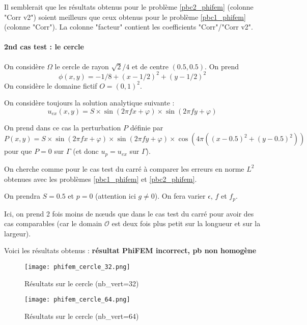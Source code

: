 Il semblerait que les résultats obtenus pour le problème \ref{pbc2_phifem} (colonne "Corr v2") soient meilleurs que ceux obtenus pour le problème \ref{pbc1_phifem} (colonne "Corr"). La colonne "facteur" contient les coefficients "Corr"/"Corr v2".

\paragraph*{2nd cas test : le cercle \\}

On considère $\Omega$ le cercle de rayon $\sqrt{2}/4$ et de centre $(0.5,0.5)$. On prend 
$$\phi(x,y)=-1/8+(x-1/2)^2+(y-1/2)^2$$
On considère le domaine fictif $O=(0,1)^2$.

On considère toujours la solution analytique suivante :
$$u_{ex}(x,y) = S\times\sin(2\pi fx + \varphi)\times\sin(2\pi fy + \varphi)$$ 

On prend dans ce cas la perturbation $P$ définie par
$$P(x,y) = S\times\sin(2\pi fx + \varphi)\times\sin(2\pi fy + \varphi)\times\cos(4\pi((x-0.5)^2+(y-0.5)^2))$$ 
pour que $P=0$ sur $\Gamma$ (et donc $u_p=u_{ex}$ sur $\Gamma$). 

On cherche comme pour le cas test du carré à comparer les erreurs en norme $L^2$ obtenues avec les problèmes \ref{pbc1_phifem} et \ref{pbc2_phifem}.

On prendra $S=0.5$ et $p=0$ (attention ici $g\ne 0$). On fera varier $\epsilon$, $f$ et $f_p$. 

\begin{Rem}
	Ici, on prend 2 fois moins de nœuds que dans le cas test du carré pour avoir des cas comparables (car le domain $\mathcal{O}$ est deux fois plus petit sur la longueur et sur la largeur).
\end{Rem}

Voici les résultats obtenus : \textbf{résultat PhiFEM incorrect, pb non homogène}

\begin{minipage}{0.48\linewidth}
	\begin{figure}[H]
		\centering
		\texttt{[image: phifem\_cercle\_32.png]}
		\caption{Résultats sur le cercle (nb\_vert=32)}
	\end{figure}
\end{minipage}
\begin{minipage}{0.48\linewidth}
	\begin{figure}[H]
		\centering
		\texttt{[image: phifem\_cercle\_64.png]}
		\caption{Résultats sur le cercle (nb\_vert=64)}
	\end{figure}
\end{minipage}

